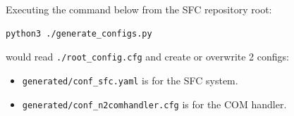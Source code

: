 Executing the command below from the SFC repository root:
\begin{verbatim}
python3 ./generate_configs.py
\end{verbatim}
would read \texttt{./root\_config.cfg} and create or overwrite 2 configs:
\begin{itemize}
	\item \texttt{generated/conf\_sfc.yaml} is for the SFC system.
	\item \texttt{generated/conf\_n2comhandler.cfg} is for the COM handler.
\end{itemize}







